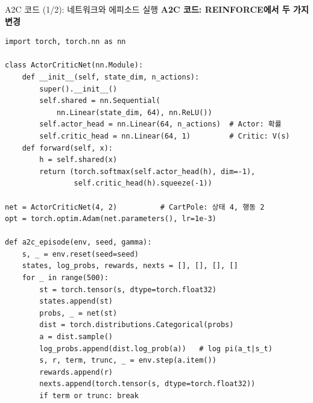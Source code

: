 \begin{frame}[fragile]{A2C 코드 (1/2): 네트워크와 에피소드 실행}
  \textbf{A2C 코드: REINFORCE에서 두 가지 변경}
\begin{lstlisting}
import torch, torch.nn as nn

class ActorCriticNet(nn.Module):
    def __init__(self, state_dim, n_actions):
        super().__init__()
        self.shared = nn.Sequential(
            nn.Linear(state_dim, 64), nn.ReLU())
        self.actor_head = nn.Linear(64, n_actions)  # Actor: 확률
        self.critic_head = nn.Linear(64, 1)         # Critic: V(s)
    def forward(self, x):
        h = self.shared(x)
        return (torch.softmax(self.actor_head(h), dim=-1),
                self.critic_head(h).squeeze(-1))

net = ActorCriticNet(4, 2)          # CartPole: 상태 4, 행동 2
opt = torch.optim.Adam(net.parameters(), lr=1e-3)

def a2c_episode(env, seed, gamma):
    s, _ = env.reset(seed=seed)
    states, log_probs, rewards, nexts = [], [], [], []
    for _ in range(500):
        st = torch.tensor(s, dtype=torch.float32)
        states.append(st)
        probs, _ = net(st)
        dist = torch.distributions.Categorical(probs)
        a = dist.sample()
        log_probs.append(dist.log_prob(a))   # log pi(a_t|s_t)
        s, r, term, trunc, _ = env.step(a.item())
        rewards.append(r)
        nexts.append(torch.tensor(s, dtype=torch.float32))
        if term or trunc: break
\end{lstlisting}

\end{frame}
